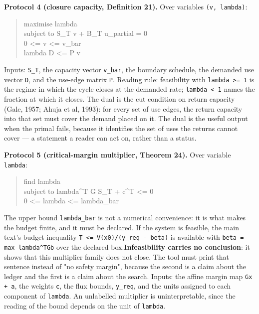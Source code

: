 \documentclass[11pt]{article}
\begin{document}
\textbf{Protocol 4 (closure capacity, Definition 21).} Over variables \texttt{(v, lambda)}:

\begin{quote}\ttfamily\footnotesize\raggedright\setlength{\parskip}{0pt}
maximise   lambda\\
subject to S\_T v + B\_T u\_partial = 0\\
           0 <= v <= v\_bar\\
           lambda D <= P v
\end{quote}

Inputs: \texttt{S\_T}, the capacity vector \texttt{v\_bar}, the boundary schedule, the demanded use vector \texttt{D}, and the use-edge matrix \texttt{P}. Reading rule: feasibility with \texttt{lambda >= 1} is the regime in which the cycle closes at the demanded rate; \texttt{lambda < 1} names the fraction at which it closes. The dual is the cut condition on return capacity (Gale, 1957; Ahuja et al, 1993): for every set of use edges, the return capacity into that set must cover the demand placed on it. The dual is the useful output when the primal fails, because it identifies the set of uses the returns cannot cover --- a statement a reader can act on, rather than a status.

\textbf{Protocol 5 (critical-margin multiplier, Theorem 24).} Over variable \texttt{lambda}:

\begin{quote}\ttfamily\footnotesize\raggedright\setlength{\parskip}{0pt}
find   lambda\\
subject to lambda\textasciicircum{}T G S\_T + c\textasciicircum{}T <= 0\\
           0 <= lambda <= lambda\_bar
\end{quote}

The upper bound \texttt{lambda\_bar} is not a numerical convenience: it is what makes the budget finite, and it must be declared. If the system is feasible, the main text's budget inequality \texttt{T <= V(x0)/\allowbreak{}(y\_req - bet\allowbreak{}a)} is available with \texttt{beta = max l\allowbreak{}ambda\textasciicircum{}TGb} over the declared box.\textbf{Infeasibility carries no conclusion}: it shows that this multiplier family does not close. The tool must print that sentence instead of "no safety margin", because the second is a claim about the ledger and the first is a claim about the search. Inputs: the affine margin map \texttt{Gx + a}, the weights \texttt{c}, the flux bounds, \texttt{y\_req}, and the units assigned to each component of \texttt{lambda}. An unlabelled multiplier is uninterpretable, since the reading of the bound depends on the unit of \texttt{lambda}.
\end{document}
